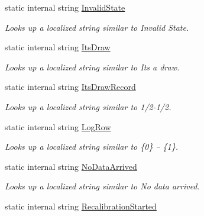 \begin{DoxyCompactItemize}
static internal string \mbox{\hyperlink{class_chess_tracking_1_1_localization_1_1_program_localization_ad3531c309899fd497e8a48ca37c905ed}{Invalid\+State}}
\begin{DoxyCompactList}\small\item\em Looks up a localized string similar to Invalid State. \end{DoxyCompactList}\item 
static internal string \mbox{\hyperlink{class_chess_tracking_1_1_localization_1_1_program_localization_a3aa0d5c5b46d20d843bf8339c3fce6cb}{Its\+Draw}}
\begin{DoxyCompactList}\small\item\em Looks up a localized string similar to Its a draw. \end{DoxyCompactList}\item 
static internal string \mbox{\hyperlink{class_chess_tracking_1_1_localization_1_1_program_localization_a0ddd784bfa8b1b850033f9cfcc1f0e13}{Its\+Draw\+Record}}
\begin{DoxyCompactList}\small\item\em Looks up a localized string similar to 1/2-\/1/2. \end{DoxyCompactList}\item 
static internal string \mbox{\hyperlink{class_chess_tracking_1_1_localization_1_1_program_localization_a07d26a217bfb648486cf920e9b143f47}{Log\+Row}}
\begin{DoxyCompactList}\small\item\em Looks up a localized string similar to \{0\} – \{1\}. \end{DoxyCompactList}\item 
static internal string \mbox{\hyperlink{class_chess_tracking_1_1_localization_1_1_program_localization_a8303918541e08be2ad94b13234c11739}{No\+Data\+Arrived}}
\begin{DoxyCompactList}\small\item\em Looks up a localized string similar to No data arrived. \end{DoxyCompactList}\item 
static internal string \mbox{\hyperlink{class_chess_tracking_1_1_localization_1_1_program_localization_aa79431d8953c9b20931538d8daad4aa3}{Recalibration\+Started}}

\end{DoxyCompactItemize}
